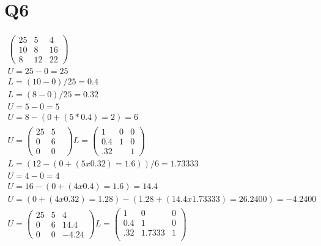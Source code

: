 \documentclass[11pt]{article} %
\begin{document}
\section{Q6}
\begin{equation}
\begin{split}
\begin{pmatrix}
25 & 5 & 4 \\
10 & 8 & 16 \\
8 & 12 & 22
\end{pmatrix} \\
U = 25 - 0 = 25 \\
L = (10 - 0) / 25 = 0.4 \\
L = (8 - 0) / 25 = 0.32\\
U = 5 - 0 = 5\\
U = 8 - (0 + ( 5 * 0.4 ) = 2) = 6\\
U = 
\begin{pmatrix}
 25& 5 &  \\
0 & 6 &  \\
0 & 0 & 
\end{pmatrix}
L=  
\begin{pmatrix}
1 & 0& 0 \\
0.4 & 1 & 0 \\
.32 &  & 1
\end{pmatrix} \\
L = (12 - (0 + ( 5 x 0.32 ) = 1.6)) / 6 = 1.73333 \\
U = 4 - 0 = 4 \\
U = 16 - (0 + ( 4 x 0.4 ) = 1.6) = 14.4 \\
U = (0 + ( 4 x 0.32 ) = 1.28) - (1.28 + ( 14.4 x 1.73333 ) = 26.2400) = -4.2400
\\
U = 
\begin{pmatrix}
 25& 5 & 4 \\
0 & 6 & 14.4 \\
0 & 0 & -4.24
\end{pmatrix}
L=  
\begin{pmatrix}
1 & 0& 0 \\
0.4 & 1 & 0 \\
.32 & 1.7333 & 1\\
\end{pmatrix} 
\end{split}
\end{equation}
\end{document}

